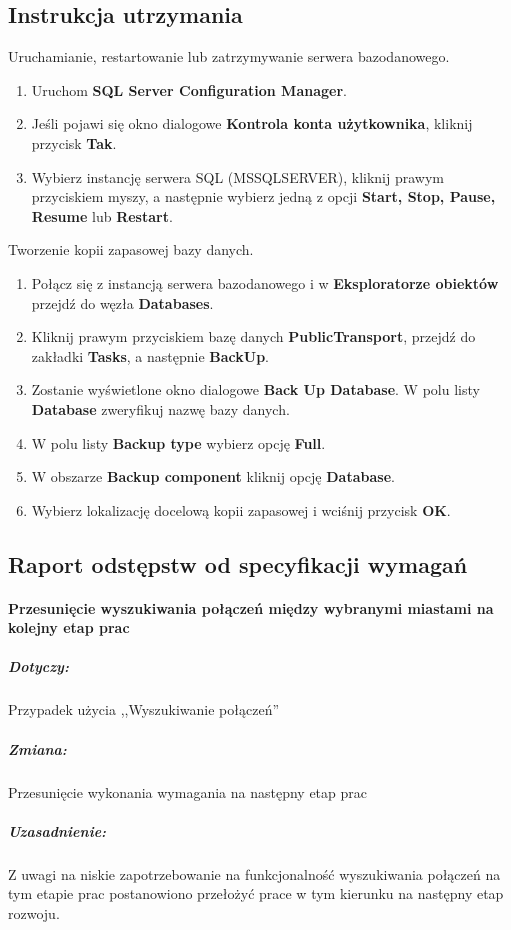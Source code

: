 \documentclass[10pt,a4paper]{article}
\begin{document}
\subsection{Instrukcja utrzymania}
Uruchamianie, restartowanie lub zatrzymywanie serwera bazodanowego.\\
\begin{enumerate}
	\item Uruchom \textbf{SQL Server Configuration Manager}.
	\item Jeśli pojawi się okno dialogowe \textbf{Kontrola konta użytkownika}, kliknij przycisk \textbf{Tak}.
	\item Wybierz instancję serwera SQL (MSSQLSERVER), kliknij prawym przyciskiem myszy, a następnie wybierz jedną z opcji \textbf{Start, Stop, Pause, Resume} lub \textbf{Restart}.
\end{enumerate}
Tworzenie kopii zapasowej bazy danych.
\begin{enumerate}
	\item Połącz się z instancją serwera bazodanowego i w \textbf{Eksploratorze obiektów} przejdź do węzła \textbf{Databases}.
	\item Kliknij prawym przyciskiem bazę danych \textbf{PublicTransport}, przejdź do zakładki \textbf{Tasks}, a następnie \textbf{BackUp}.
	\item Zostanie wyświetlone okno dialogowe \textbf{Back Up Database}. W polu listy \textbf{Database} zweryfikuj nazwę bazy danych.
	\item W polu listy \textbf{Backup type} wybierz opcję \textbf{Full}.
	\item W obszarze \textbf{Backup component} kliknij opcję \textbf{Database}.
	\item Wybierz lokalizację docelową kopii zapasowej i wciśnij przycisk \textbf{OK}.
\end{enumerate}

\subsection{Raport odstępstw od specyfikacji wymagań}

\paragraph{Przesunięcie wyszukiwania połączeń między wybranymi miastami na kolejny etap prac}
\subparagraph{Dotyczy:} Przypadek użycia ,,Wyszukiwanie połączeń''
\subparagraph{Zmiana:} Przesunięcie wykonania wymagania na następny etap prac
\subparagraph{Uzasadnienie:} Z uwagi na niskie zapotrzebowanie na funkcjonalność wyszukiwania połączeń na tym etapie prac postanowiono przełożyć prace w tym kierunku na następny etap rozwoju.
\end{document}
